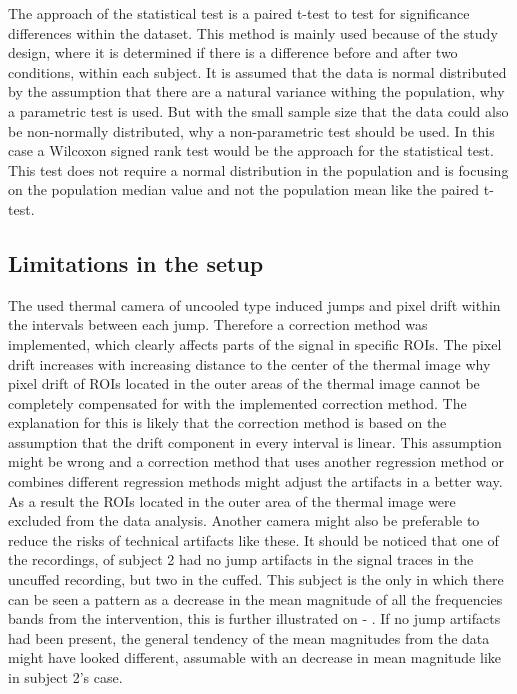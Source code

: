 The approach of the statistical test is a paired t-test to test for significance differences within the dataset. This method is mainly used because of the study design, where it is determined if there is a difference before and after two conditions, within each subject. It is assumed that the data is normal distributed by the assumption that there are a natural variance withing the population, why a parametric test is used. But with the small sample size that the data could also be non-normally distributed, why a non-parametric test should be used. In this case a Wilcoxon signed rank test would be the approach for the statistical test. This test does not require a normal distribution in the population and is focusing on the population median value and not the population mean like the paired t-test\cite{imam2014}.

\subsection{Limitations in the setup}
The used thermal camera of uncooled type induced jumps and pixel drift within the intervals between each jump. Therefore a correction method was implemented, which clearly affects parts of the signal in specific ROIs. The pixel drift increases with increasing distance to the center of the thermal image why pixel drift of ROIs located in the outer areas of the thermal image cannot be completely compensated for with the implemented correction method. The explanation for this is likely that the correction method is based on the assumption that the drift component in every interval is linear. This assumption might be wrong and a correction method that uses another regression method or combines different regression methods might adjust the artifacts in a better way. As a result the ROIs located in the outer area of the thermal image were excluded from the data analysis. Another camera might also be preferable to reduce the risks of technical artifacts like these. 
It should be noticed that one of the recordings, of subject 2 had no jump artifacts in the signal traces in the uncuffed recording, but two in the cuffed. This subject is the only in which there can be seen a pattern as a decrease in the mean magnitude of all the frequencies bands from the intervention, this is further illustrated on  - . If no jump artifacts had been present, the general tendency of the mean magnitudes from the data might have looked different, assumable with an decrease in mean magnitude like in subject 2's case.

